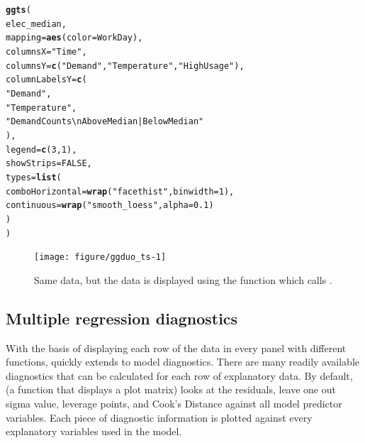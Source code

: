 \documentclass[stat,dissertation]{puthesis}\usepackage[]{graphicx}\usepackage{xcolor}
\makeatletter
\newcommand{\hlnum}[1]{\textcolor[rgb]{0.686,0.059,0.569}{#1}}%
\newcommand{\hlstr}[1]{\textcolor[rgb]{0.192,0.494,0.8}{#1}}%
\newcommand{\hlstd}[1]{\textcolor[rgb]{0.345,0.345,0.345}{#1}}%
\newcommand{\hlkwc}[1]{\textcolor[rgb]{0.333,0.667,0.333}{#1}}%
\newcommand{\hlkwd}[1]{\textcolor[rgb]{0.737,0.353,0.396}{\textbf{#1}}}%
\newenvironment{kframe}{%
 \def\at@end@of@kframe{}%
 \ifinner\ifhmode%
  \def\at@end@of@kframe{\end{minipage}}%
  \begin{minipage}{\columnwidth}%
 \fi\fi%
 \def\FrameCommand##1{\hskip\@totalleftmargin \hskip-\fboxsep
 \colorbox{shadecolor}{##1}\hskip-\fboxsep
     \hskip-\linewidth \hskip-\@totalleftmargin \hskip\columnwidth}%
 \MakeFramed {\advance\hsize-\width
   \@totalleftmargin\z@ \linewidth\hsize
   \@setminipage}}%
 {\par\unskip\endMakeFramed%
 \at@end@of@kframe}
\newenvironment{knitrout}{}{} %
\renewenvironment{knitrout}{\setstretch{1}}{}
\makeatother
\begin{document}
\begin{knitrout}\small
{}\color{fgcolor}\begin{kframe}
\begin{alltt}
\hlkwd{ggts}\hlstd{(}
  \hlstd{elec_median,}
  \hlkwc{mapping} \hlstd{=} \hlkwd{aes}\hlstd{(}\hlkwc{color} \hlstd{= WorkDay),}
  \hlkwc{columnsX} \hlstd{=} \hlstr{"Time"}\hlstd{,}
  \hlkwc{columnsY} \hlstd{=} \hlkwd{c}\hlstd{(}\hlstr{"Demand"}\hlstd{,} \hlstr{"Temperature"}\hlstd{,} \hlstr{"HighUsage"}\hlstd{),}
  \hlkwc{columnLabelsY} \hlstd{=} \hlkwd{c}\hlstd{(}
    \hlstr{"Demand"}\hlstd{,}
    \hlstr{"Temperature"}\hlstd{,}
    \hlstr{"Demand Counts\textbackslash{}nAbove Median  |  Below Median"}
  \hlstd{),}
  \hlkwc{legend} \hlstd{=} \hlkwd{c}\hlstd{(}\hlnum{3}\hlstd{,}\hlnum{1}\hlstd{),}
  \hlkwc{showStrips} \hlstd{=} \hlnum{FALSE}\hlstd{,}
  \hlkwc{types} \hlstd{=} \hlkwd{list}\hlstd{(}
    \hlkwc{comboHorizontal} \hlstd{=} \hlkwd{wrap}\hlstd{(}\hlstr{"facethist"}\hlstd{,} \hlkwc{binwidth} \hlstd{=} \hlnum{1}\hlstd{),}
    \hlkwc{continuous} \hlstd{=} \hlkwd{wrap}\hlstd{(}\hlstr{"smooth_loess"}\hlstd{,} \hlkwc{alpha} \hlstd{=} \hlnum{0.1}\hlstd{)}
  \hlstd{)}
\hlstd{)}
\end{alltt}
\end{kframe}\begin{figure}[H]

{\centering \texttt{[image: figure/ggduo\_ts-1]} 

}

\caption{Same  data, but the data is displayed using the  function which calls .}\label{fig:ggduo_ts}
\end{figure}


\end{knitrout}


\subsection{Multiple regression diagnostics}


With the basis of  displaying each row of the data in every panel with different functions,  quickly extends to model diagnostics. There are many readily available diagnostics that can be calculated for each row of explanatory data. By default,  (a function that displays a  plot matrix) looks at the residuals, leave one out sigma value, leverage points, and Cook's Distance against all model predictor variables.  Each piece of diagnostic information is plotted against every explanatory variables used in the model.
\end{document}
